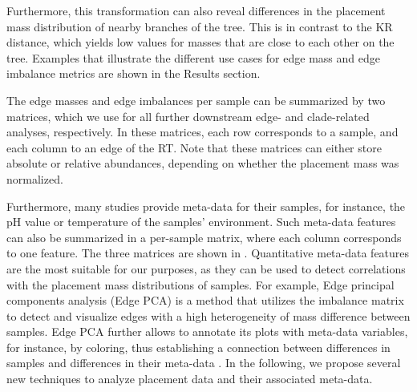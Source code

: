 Furthermore, this transformation can also reveal differences in the placement mass distribution
of nearby branches of the tree.
This is in contrast to the KR distance, which yields low values for masses that are close to each other on the tree.
Examples that illustrate the different use cases for edge mass and edge imbalance metrics are shown in the Results section.

The edge masses and edge imbalances per sample can be summarized by two matrices,
which we use for all further downstream edge- and clade-related analyses, respectively.
In these matrices, each row corresponds to a sample, and each column to an edge of the \ac{RT}.
Note that these matrices can either store absolute or relative abundances,
depending on whether the placement mass was normalized.

Furthermore, many studies provide meta-data for their samples,
for instance, the pH value or temperature of the samples' environment.
Such meta-data features can also be summarized in a per-sample matrix, where each column corresponds to one feature.
The three matrices are shown in .
Quantitative meta-data features are the most suitable for our purposes,
as they can be used to detect correlations with the placement mass distributions of samples.
For example, Edge principal components analysis (Edge PCA) \cite{Matsen2011a}
is a method that utilizes the imbalance matrix to detect and visualize edges
with a high heterogeneity of mass difference between samples.
Edge PCA further allows to annotate its plots with meta-data variables, for instance, by coloring,
thus establishing a connection between differences in samples and differences in their meta-data \cite{Srinivasan2012}.
In the following, we propose several new techniques to analyze placement data and their associated meta-data.


